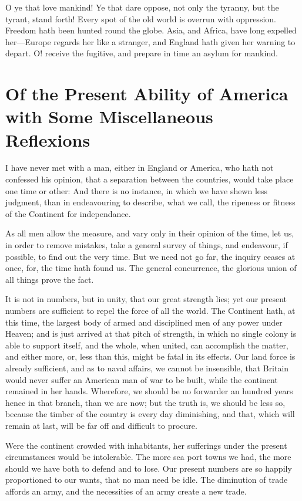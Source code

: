 \documentclass[12pt,oneside]{memoir}
\begin{document}
O ye that love mankind! Ye that dare oppose, not only the tyranny, but the tyrant, stand forth! Every spot of the old world is overrun with oppression. Freedom hath been hunted round the globe. Asia, and Africa, have long expelled her---Europe regards her like a stranger, and England hath given her warning to depart. O! receive the fugitive, and prepare in time an asylum for mankind.


\section*{Of the Present Ability of America with Some Miscellaneous Reflexions}

I have never met with a man, either in England or America, who hath not confessed his opinion, that a separation between the countries, would take place one time or other: And there is no instance, in which we have shewn less judgment, than in endeavouring to describe, what we call, the ripeness or fitness of the Continent for independance.

As all men allow the measure, and vary only in their opinion of the time, let us, in order to remove mistakes, take a general survey of things, and endeavour, if possible, to find out the very time. But we need not go far, the inquiry ceases at once, for, the time hath found us. The general concurrence, the glorious union of all things prove the fact.

It is not in numbers, but in unity, that our great strength lies; yet our present numbers are sufficient to repel the force of all the world. The Continent hath, at this time, the largest body of armed and disciplined men of any power under Heaven; and is just arrived at that pitch of strength, in which no single colony is able to support itself, and the whole, when united, can accomplish the matter, and either more, or, less than this, might be fatal in its effects. Our land force is already sufficient, and as to naval affairs, we cannot be insensible, that Britain would never suffer an American man of war to be built, while the continent remained in her hands. Wherefore, we should be no forwarder an hundred years hence in that branch, than we are now; but the truth is, we should be less so, because the timber of the country is every day diminishing, and that, which will remain at last, will be far off and difficult to procure.

Were the continent crowded with inhabitants, her sufferings under the present circumstances would be intolerable. The more sea port towns we had, the more should we have both to defend and to lose. Our present numbers are so happily proportioned to our wants, that no man need be idle. The diminution of trade affords an army, and the necessities of an army create a new trade.
\end{document}
